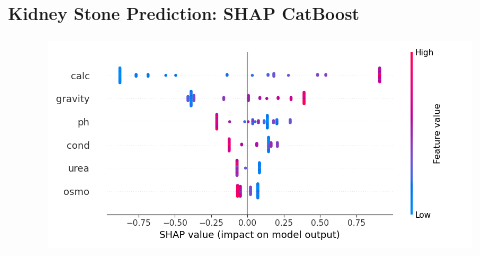 \documentclass{beamer}
\begin{document}

\begin{frame}
\frametitle{Kidney Stone Prediction: SHAP CatBoost}
\begin{figure}[H]
 \centering
 \includegraphics[scale=0.5]{shap_lgbm_kidney.png}
\end{figure}
\end{frame}
\end{document}
